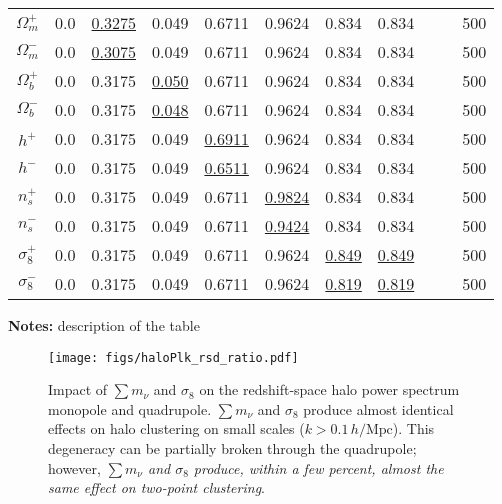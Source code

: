 \documentclass[12pt, letterpaper, preprint]{aastex62}
\newcommand{\smnu}{\sum m_\nu}
\newcommand{\sig}{\sigma_8}
\newcommand{\hmpc}{\,h/\mathrm{Mpc}}
\begin{document}
\begin{table}
\begin{center}
\begin{tabular}{ccccccccccc}
    $\Omega_m^+$    & 0.0   & \underline{ 0.3275} & 0.049 & 0.6711 & 0.9624 & 0.834 & 0.834 & & & 500 \\ 
    $\Omega_m^-$    & 0.0   & \underline{ 0.3075} & 0.049 & 0.6711 & 0.9624 & 0.834 & 0.834 & & & 500 \\ 
    $\Omega_b^+$    & 0.0   & 0.3175 & \underline{0.050} & 0.6711 & 0.9624 & 0.834 & 0.834 & & & 500 \\ 
    $\Omega_b^-$    & 0.0   & 0.3175 & \underline{0.048} & 0.6711 & 0.9624 & 0.834 & 0.834 & & & 500 \\ 
    $h^+$           & 0.0   & 0.3175 & 0.049 & \underline{0.6911} & 0.9624 & 0.834 & 0.834 & & & 500 \\ 
    $h^-$           & 0.0   & 0.3175 & 0.049 & \underline{0.6511} & 0.9624 & 0.834 & 0.834 & & & 500 \\ 
    $n_s^+$         & 0.0   & 0.3175 & 0.049 & 0.6711 & \underline{0.9824} & 0.834 & 0.834 & & & 500 \\ 
    $n_s^-$         & 0.0   & 0.3175 & 0.049 & 0.6711 & \underline{0.9424} & 0.834 & 0.834 & & & 500 \\ 
    $\sigma_8^+$    & 0.0   & 0.3175 & 0.049 & 0.6711 & 0.9624 & \underline{0.849} & \underline{0.849} & & & 500 \\ 
    $\sigma_8^-$    & 0.0   & 0.3175 & 0.049 & 0.6711 & 0.9624 & \underline{0.819} & \underline{0.819} & & & 500 \\ 
    \hline
\end{tabular} \label{tab:sims}
\end{center}
    {\bf Notes:} description of the table
\end{table}

\begin{figure}
\begin{center}
\texttt{[image: figs/haloPlk\_rsd\_ratio.pdf]}
    \caption{Impact of $\smnu$ and $\sig$ on the redshift-space halo power 
    spectrum monopole and quadrupole. $\smnu$ and $\sig$ produce almost identical 
    effects on halo clustering on small scales ($k > 0.1\hmpc$). This degeneracy 
    can be partially broken through the quadrupole; however, {\em $\smnu$ and $\sig$ 
    produce, within a few percent, almost the same effect on two-point clustering}.
    }
\label{fig:plk}
\end{center}
\end{figure}

\end{document}
